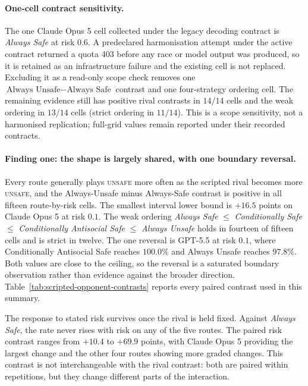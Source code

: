 \documentclass[sigconf,anonymous]{aamas}
\newcommand{\Unsafe}{\textsc{unsafe}}
\begin{document}
\paragraph{One-cell contract sensitivity.} The one Claude Opus 5 cell collected
under the legacy decoding contract is \emph{Always Safe} at risk $0.6$. A
predeclared harmonisation attempt under the active contract returned a quota
403 before any race or model output was produced, so it is retained as an
infrastructure failure and the existing cell is not replaced. Excluding it as a
read-only scope check removes one $\text{Always Unsafe} - \text{Always Safe}$
contrast and one four-strategy ordering cell. The remaining evidence still has
positive rival contrasts in $14/14$ cells and the weak ordering in $13/14$
cells (strict ordering in $11/14$). This is a scope sensitivity, not a
harmonised replication; full-grid values remain reported under their recorded
contracts.

\paragraph{Finding one: the shape is largely shared, with one boundary
reversal.} Every route generally plays \Unsafe{} more often as the scripted
rival becomes more \Unsafe{}, and the Always-Unsafe minus Always-Safe contrast
is positive in all fifteen route-by-risk cells. The smallest interval lower
bound is $+16.5$ points on Claude Opus 5 at risk $0.1$. The weak ordering
\emph{Always Safe} $\leq$ \emph{Conditionally Safe} $\leq$
\emph{Conditionally Antisocial Safe} $\leq$ \emph{Always Unsafe} holds in
fourteen of fifteen cells and is strict in twelve. The one reversal is GPT-5.5
at risk $0.1$, where Conditionally Antisocial Safe reaches $100.0\%$ and Always
Unsafe reaches
$97.8\%$. Both values are close to the ceiling, so the reversal is a
saturated boundary observation rather than evidence against the broader
direction. Table~\ref{tab:scripted-opponent-contrasts} reports every paired
contrast used in this summary.

The response to stated risk survives once the rival is held fixed. Against
\emph{Always Safe}, the rate never rises with risk on any of the five routes.
The paired risk contrast ranges from $+10.4$ to $+69.9$ points, with Claude
Opus 5 providing the largest change and the other four routes showing more
graded changes. This contrast is not interchangeable with the rival contrast:
both are paired within repetitions, but they change different parts of the
interaction.
\end{document}
